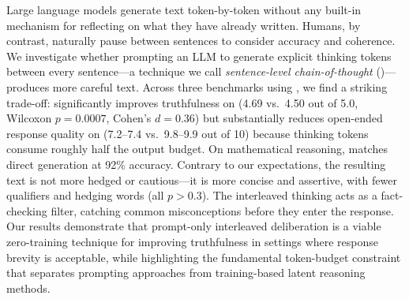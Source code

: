 Large language models generate text token-by-token without any built-in mechanism for reflecting on what they have already written. Humans, by contrast, naturally pause between sentences to consider accuracy and coherence. We investigate whether prompting an LLM to generate explicit thinking tokens between every sentence---a technique we call \emph{sentence-level chain-of-thought} (\sentthink)---produces more careful text. Across three benchmarks using \gptfour, we find a striking trade-off: \sentthink significantly improves truthfulness on \tqa (4.69 vs.\ 4.50 out of 5.0, Wilcoxon $p{=}0.0007$, Cohen's $d{=}0.36$) but substantially reduces open-ended response quality on \mtbench (7.2--7.4 vs.\ 9.8--9.9 out of 10) because thinking tokens consume roughly half the output budget. On \gsm mathematical reasoning, \sentthink matches direct generation at 92\% accuracy. Contrary to our expectations, the resulting text is not more hedged or cautious---it is more concise and assertive, with fewer qualifiers and hedging words (all $p{>}0.3$). The interleaved thinking acts as a fact-checking filter, catching common misconceptions before they enter the response. Our results demonstrate that prompt-only interleaved deliberation is a viable zero-training technique for improving truthfulness in settings where response brevity is acceptable, while highlighting the fundamental token-budget constraint that separates prompting approaches from training-based latent reasoning methods.
